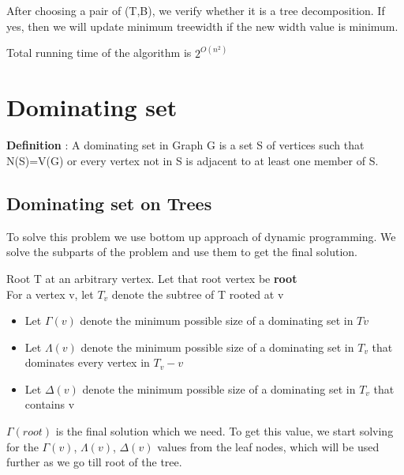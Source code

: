 \hspace*{1.5cm} After choosing a pair of (T,B), we verify whether it is a tree decomposition. If yes, then we will 
update minimum treewidth if the new width value is minimum.

Total running time of the algorithm is $2^{O(n^2)}$


\section{Dominating set}

\textbf{Definition} : 
A dominating set in Graph G is a set S of vertices such that N(S)=V(G)
or every vertex not in S is adjacent to at least one member of S.

\subsection{Dominating set on Trees}
\vspace{0.6cm}

To solve this problem we use bottom up approach of dynamic programming.
We solve the subparts of the problem and use them to get the final solution.

\vspace{0.5cm}
Root T at an arbitrary vertex. Let that root vertex be \textbf{root} \\
For a vertex v, let $T_v$ denote the subtree of T rooted at v 

\begin{itemize}    
\item Let $\Gamma(v)$ denote the minimum possible size of a dominating set in $Tv$ \vspace{-0.4cm}
\item Let $\Lambda(v)$ denote the minimum possible size of a dominating set in $T_v$ 
that dominates every vertex in $T_v-v$ \vspace{-0.4cm}
\item Let $\Delta(v)$ denote the minimum possible size of a dominating set in $T_v$ that 
contains v
\end{itemize}

$\Gamma(root)$ is the final solution which we need. To get this value, we start
solving for the $\Gamma(v)$, $\Lambda(v)$, $\Delta(v)$ values from the leaf nodes, which
 will be used further as we 
go till root of the tree. 

